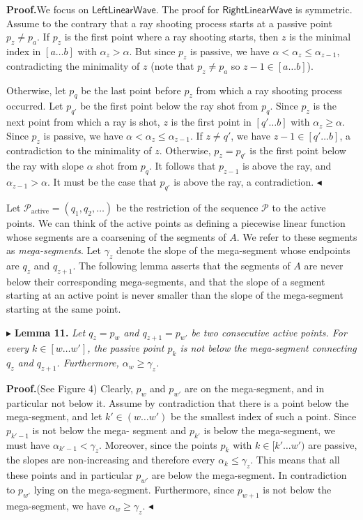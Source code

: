 \documentclass[11pt]{article}
\newcommand{\Pset}{\mathcal{P}}
\newcommand{\Pact}{\mathcal{P}_{\mathrm{active}}}
\newcommand{\Lwave}{\ensuremath{\mathsf{LeftLinearWave}}}
\newcommand{\Rwave}{\ensuremath{\mathsf{RightLinearWave}}}
\begin{document}
\smallskip
\noindent\textbf{Proof.}\quad We focus on \Lwave. The proof for \Rwave{} is symmetric. Assume
to the contrary that a ray shooting process starts at a passive point $p_z \neq p_a$. If $p_z$ is the
first point where a ray shooting starts, then $z$ is the minimal index in $[a \ldots b]$ with $\alpha_z > \alpha$.
But since $p_z$ is passive, we have $\alpha < \alpha_z \le \alpha_{z-1}$, contradicting the minimality of $z$ (note that
$p_z \neq p_a$ so $z - 1 \in [a \ldots b]$).

Otherwise, let $p_q$ be the last point before $p_z$ from which a ray shooting process occurred.
Let $p_{q'}$ be the first point below the ray shot from $p_q$. Since $p_z$ is the next point from which
a ray is shot, $z$ is the first point in $[q' \ldots b]$ with $\alpha_z \ge \alpha$. Since $p_z$ is passive, we have
$\alpha < \alpha_z \le \alpha_{z-1}$. If $z \neq q'$, we have $z - 1 \in [q' \ldots b]$, a contradiction to the minimality of $z$.
Otherwise, $p_z = p_{q'}$ is the first point below the ray with slope $\alpha$ shot from $p_q$. It follows
that $p_{z-1}$ is above the ray, and $\alpha_{z-1} > \alpha$. It must be the case that $p_{q'}$ is above the ray, a
contradiction. \hfill$\blacktriangleleft$

\smallskip
Let $\Pact = (q_1, q_2, \ldots)$ be the restriction of the sequence $\Pset$ to the active points. We
can think of the active points as defining a piecewise linear function whose segments are
a coarsening of the segments of $A$. We refer to these segments as \emph{mega-segments}. Let $\gamma_z$
denote the slope of the mega-segment whose endpoints are $q_z$ and $q_{z+1}$. The following lemma
asserts that the segments of $A$ are never below their corresponding mega-segments, and that
the slope of a segment starting at an active point is never smaller than the slope of the
mega-segment starting at the same point.

\smallskip
$\blacktriangleright$ \textbf{Lemma 11.} \emph{Let $q_z = p_w$ and $q_{z+1} = p_{w'}$ be two consecutive active points. For every
$k \in [w \ldots w']$, the passive point $p_k$ is not below the mega-segment connecting $q_z$ and $q_{z+1}$.
Furthermore, $\alpha_w \ge \gamma_z$.}

\smallskip
\noindent\textbf{Proof.}\quad (See Figure 4) Clearly, $p_w$ and $p_{w'}$ are on the mega-segment, and in particular not
below it. Assume by contradiction that there is a point below the mega-segment, and let
$k' \in (w \ldots w')$ be the smallest index of such a point. Since $p_{k'-1}$ is not below the mega-
segment and $p_{k'}$ is below the mega-segment, we must have $\alpha_{k'-1} < \gamma_z$. Moreover, since the
points $p_k$ with $k \in [k' \ldots w')$ are passive, the slopes are non-increasing and therefore every
$\alpha_k \le \gamma_z$. This means that all these points and in particular $p_{w'}$ are below the mega-segment.
In contradiction to $p_{w'}$ lying on the mega-segment. Furthermore, since $p_{w+1}$ is not below
the mega-segment, we have $\alpha_w \ge \gamma_z$. \hfill$\blacktriangleleft$
\end{document}
